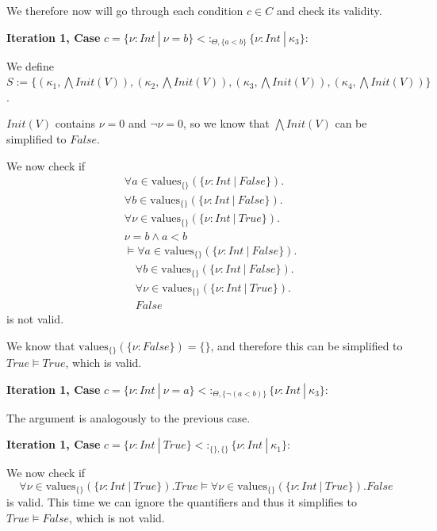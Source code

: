 \documentclass[]{scrbook}
\theoremstyle{definition}
\theoremstyle{definition}
\theoremstyle{definition}
\theoremstyle{remark}
\begin{document}
We therefore now will go through each condition \(c\in C\) and check its
validity.

\textbf{Iteration 1, Case }
\(c = \{\nu:\mathit{Int}\ |\ \nu = b\}<:_{\Theta,\{a < b\}}\{\nu:\mathit{Int}\ |\ \kappa_3\}\):

We define
\(S :=\{(\kappa_1,\bigwedge \mathit{Init}(V)),(\kappa_2,\bigwedge \mathit{Init}(V)),(\kappa_3,\bigwedge \mathit{Init}(V)),(\kappa_4,\bigwedge \mathit{Init}(V))\}\).

\(\mathit{Init}(V)\) contains \(\nu = 0\) and \(\neg \nu = 0\), so we
know that \(\bigwedge \mathit{Init}(V)\) can be simplified to
\(\mathit{False}\).

We now check if \[
\begin{aligned}
&\forall a\in\text{values}_{\{\}}(\{\nu:\mathit{Int}\ |\ \mathit{False}\}).\\
&\forall b\in\text{values}_{\{\}}(\{\nu:\mathit{Int}\ |\ \mathit{False}\}).\\
&\forall \nu\in\text{values}_{\{\}}(\{\nu:\mathit{Int}\ |\ \mathit{True}\}).\\
&\nu = b \land a < b\\
&\vDash\forall a\in\text{values}_{\{\}}(\{\nu:\mathit{Int}\ |\ \mathit{False}\}).\\
&\quad\forall b\in\text{values}_{\{\}}(\{\nu:\mathit{Int}\ |\ \mathit{False}\}).\\
&\quad\forall \nu\in\text{values}_{\{\}}(\{\nu:\mathit{Int}\ |\ \mathit{True}\}).\\
&\quad\mathit{False}
\end{aligned}
\] is not valid.

We know that \(\text{values}_{\{\}}(\{\nu:\mathit{False}\})=\{\}\), and
therefore this can be simplified to
\(\mathit{True}\vDash\mathit{True}\), which is valid.

\textbf{Iteration 1, Case }
\(c = \{\nu:\mathit{Int}\ |\ \nu = a\}<:_{\Theta,\{\neg (a < b)\}}\{\nu:\mathit{Int}\ |\ \kappa_3\}\):

The argument is analogously to the previous case.

\textbf{Iteration 1, Case }
\(c = \{\nu:\mathit{Int}\ |\  \mathit{True}\}<:_{\{\},\{\}}\{\nu:\mathit{Int}\ |\ \kappa_1\}\):

We now check if \[
\forall \nu\in\text{values}_{\{\}}(\{\nu:\mathit{Int}\ |\ \mathit{True}\}).\mathit{True}\vDash\forall \nu\in\text{values}_{\{\}}(\{\nu:\mathit{Int}\ |\ \mathit{True}\}).\mathit{False}
\] is valid. This time we can ignore the quantifiers and thus it
simplifies to \(\mathit{True}\vDash\mathit{False}\), which is not valid.
\end{document}
